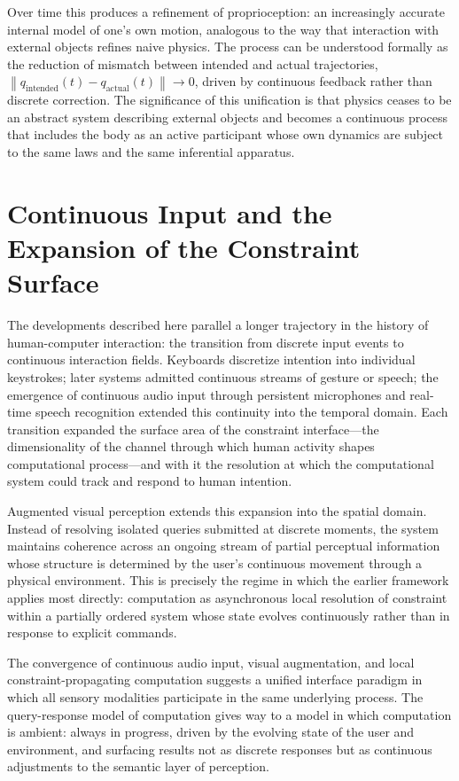 \documentclass[12pt,a4paper,openany]{book}
\theoremstyle{plain}
\theoremstyle{definition}
\theoremstyle{remark}
\newcommand{\norm}[1]{\left\|#1\right\|}
\begin{document}
Over time this produces a refinement of proprioception: an increasingly accurate internal model of one's own motion, analogous to the way that interaction with external objects refines naive physics. The process can be understood formally as the reduction of mismatch between intended and actual trajectories, $\norm{q_{\text{intended}}(t) - q_{\text{actual}}(t)} \to 0$, driven by continuous feedback rather than discrete correction. The significance of this unification is that physics ceases to be an abstract system describing external objects and becomes a continuous process that includes the body as an active participant whose own dynamics are subject to the same laws and the same inferential apparatus.

\section{Continuous Input and the Expansion of the Constraint Surface}

The developments described here parallel a longer trajectory in the history of human-computer interaction: the transition from discrete input events to continuous interaction fields. Keyboards discretize intention into individual keystrokes; later systems admitted continuous streams of gesture or speech; the emergence of continuous audio input through persistent microphones and real-time speech recognition extended this continuity into the temporal domain. Each transition expanded the surface area of the constraint interface---the dimensionality of the channel through which human activity shapes computational process---and with it the resolution at which the computational system could track and respond to human intention.

Augmented visual perception extends this expansion into the spatial domain. Instead of resolving isolated queries submitted at discrete moments, the system maintains coherence across an ongoing stream of partial perceptual information whose structure is determined by the user's continuous movement through a physical environment. This is precisely the regime in which the earlier framework applies most directly: computation as asynchronous local resolution of constraint within a partially ordered system whose state evolves continuously rather than in response to explicit commands.

The convergence of continuous audio input, visual augmentation, and local constraint-propagating computation suggests a unified interface paradigm in which all sensory modalities participate in the same underlying process. The query-response model of computation gives way to a model in which computation is ambient: always in progress, driven by the evolving state of the user and environment, and surfacing results not as discrete responses but as continuous adjustments to the semantic layer of perception.
\end{document}
